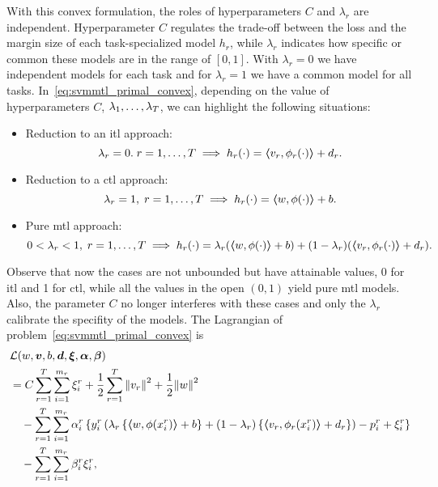 With this convex formulation, the roles of hyperparameters $C$ and $\lambda_r$ are independent. Hyperparameter $C$ regulates the trade-off between the loss and the margin size of each task-specialized model $h_r$, while $\lambda_r$ indicates how specific or common these models are in the range of $[0, 1]$. With $\lambda_r=0$ we have independent models for each task and for $\lambda_r=1$ we have a common model for all tasks. 
%
In~\eqref{eq:svmmtl_primal_convex}, depending on the value of hyperparameters $C$, $\lambda_1, \ldots, \lambda_T$, we can highlight the following situations:
%
\begin{itemize}
    \item Reduction to an \acrshort{itl} approach:
    $$\lambda_r = 0 .\; r=1, \ldots, T \implies h_r(\cdot) = \bm{\left\langle} {v}_r, \phi_r(\cdot) \bm{\right\rangle} + d_r .$$
    \item Reduction to a \acrshort{ctl} approach: 
    $$ \lambda_r = 1 ,\; r=1, \ldots, T \implies h_r(\cdot) = \bm{\left\langle} w, \phi(\cdot) \bm{\right\rangle} + b .$$
    \item Pure \acrshort{mtl} approach:
    $$ 0 < \lambda_r < 1 ,\; r=1, \ldots, T \implies h_r(\cdot) = \lambda_r (\bm{\left\langle} w, \phi(\cdot) \bm{\right\rangle} + b ) + (1 - \lambda_r) (\bm{\left\langle} {v}_r, \phi_r(\cdot) \bm{\right\rangle} + d_r) .$$
\end{itemize}
Observe that now the cases are not unbounded but have attainable values, 0 for \acrshort{itl} and 1 for \acrshort{ctl}, while all the values in the open $(0, 1)$ yield pure \acrshort{mtl} models. Also, the parameter $C$ no longer interferes with these cases and only the $\lambda_r$ calibrate the specifity of the models.
 The Lagrangian of problem~\eqref{eq:svmmtl_primal_convex} is
\begin{equation}
    \nonumber
    \begin{aligned}
        & \mathcal{L}({w}, \bm{v}, b, \bm{d}, \bm{\xi}, \bm{\alpha}, \bm{\beta}) \\
        &=  C \sum_{r= 1}^T \sum_{i=1}^{m_r} {\xi_{i}^r} + \frac{1}{2} \sum_{r= 1}^T{\left\lVert{v}_r\right\rVert^2} + \frac{1}{2} {\left\lVert{w}\right\rVert}^2 \\
        &\quad -  \sum_{r= 1}^T \sum_{i=1}^{m_r} \alpha_i^r \left\lbrace y_{i}^r  \left(\lambda_r \left\lbrace \bm{\left\langle} w, \phi(x_{i}^r) \bm{\right\rangle} + b  \right\rbrace + (1 - \lambda_r) \left\lbrace \bm{\left\langle} {v}_r, \phi_r(x_{i}^r) \bm{\right\rangle} + d_r \right\rbrace  \right) - p_{i}^r + \xi_{i}^r  \right\rbrace \\
        &\quad -  \sum_{r= 1}^T \sum_{i=1}^{m_r} \beta_i^r \xi_i^r ,
    \end{aligned}
\end{equation}

